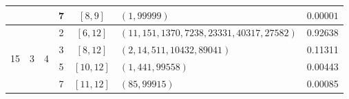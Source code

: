 \documentclass[a4paper,11pt,reqno]{article}
\theoremstyle{plain} \numberwithin{equation}{section}
\theoremstyle{definition}
\begin{document}
\begin{appendices}
\begin{table}[!ht]
\begin{tabular}{|c|c|c|c|c|l|c|}
                    &                    &                    & 7   & $[8, 9]$ & $(1, 99999)$ & $0.00001$ \\
\hline
\multirow{4}{*}{15} & \multirow{4}{*}{3} & \multirow{4}{*}{4} 
                    & 2   & $[6, 12]$ & $(11, 151, 1370, 7238, 23331, 40317, 27582)$ & 0.92638 \\
                    &                    &                    & 3   & $[8, 12]$ & $(2, 14, 511, 10432, 89041)$ & 0.11311 \\
                    &                    &                    & 5   & $[10, 12]$ & $(1, 441, 99558)$ & 0.00443 \\
                    &                    &                    & 7   & $[11, 12]$ & $(85, 99915)$ & 0.00085 \\
\hline
\end{tabular}
\end{table}



\end{appendices}
\end{document}
